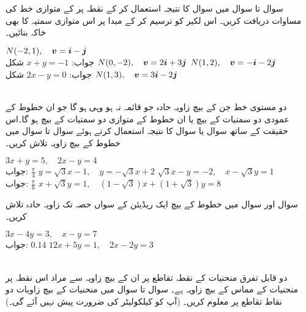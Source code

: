 سوال  تا سوال  میں سوال  کا نتیجہ استعمال کر کے نقطہ  پر   کے متوازی خط کی مساوات دریافت کریں۔ اس لکیر کو ترسیم کر کے مبدا پر اس متوازی سمتیہ کا بھی خاکہ بنائیں۔

$N(-2,1),\quad {\ensuremath{{\boldsymbol{v}}}}={\boldsymbol{i}}-{\boldsymbol{j}}$\\
جواب:\quad
$x+y=-1$\quad
شکل 
$N(0,-2),\quad {\ensuremath{{\boldsymbol{v}}}}=2{\boldsymbol{i}}+3{\boldsymbol{j}}$
$N(1,2),\quad {\ensuremath{{\boldsymbol{v}}}}=-{\boldsymbol{i}}-2{\boldsymbol{j}}$\\
جواب:\quad
$2x-y=0$\quad
شکل 
$N(1,3),\quad {\ensuremath{{\boldsymbol{v}}}}=3{\boldsymbol{i}}-2{\boldsymbol{j}}$

\\
دو مستوی خط جن کے بیچ زاویہ حادہ جو قائمہ نہ ہو  وہی ہو گا جو ان خطوط کے عمودی دو سمتیات کے بیچ یا ان خطوط کے متوازی دو سمتیات کے بیچ ہو گا۔اس حقیقت کے ساتھ  سوال  یا سوال  کا نتیجہ استعمال کرتے ہوئے  سوال  تا سوال  میں خطوط کے بیچ زاویہ تلاش کریں۔

$3x+y=5,\quad 2x-y=4$\\
جواب:\quad
$\tfrac{\pi}{4}$
$y=\sqrt{3}x-1,\quad y=-\sqrt{3}x+2$
$\sqrt{3}x-y=-2,\quad x-\sqrt{3}y=1$\\
جواب:\quad
$\tfrac{\pi}{6}$
$x+\sqrt{3}y=1,\quad (1-\sqrt{3})x+(1+\sqrt{3})y=8$

سوال  اور سوال  میں خطوط کے بیچ  ایک ریڈیئن کے سواں حصہ تک زاویہ حادہ تلاش کریں۔

$3x-4y=3,\quad x-y=7$\\
جواب:\quad
$0.14$
$12x+5y=1,\quad 2x-2y=3$

\\
دو قابل تفرق منحنیات کے نقطہ تقاطع پر ان کے بیچ زاویہ سے مراد اس نقطہ پر منحنیات کے مماس کے بیچ زاویہ ہے۔ سوال  تا سوال  میں منحنیات کے بیچ زاویات دو نقاط تقاطع پر معلوم کریں۔  (آپ کو کیلکولیٹر کی ضرورت پیش نہیں آئے گی۔)

